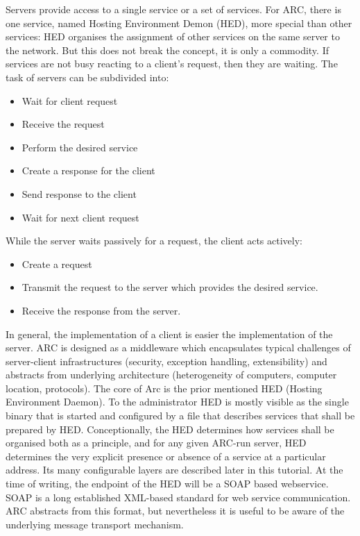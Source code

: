 Servers provide access to a single service or a set of services. For ARC, there is one service, named Hosting Environment Demon (HED), more special than other services: HED organises the assignment of other services on the same server to the network. But this does not break the concept, it is only a commodity. If services are not busy reacting to a client's request, then they are waiting. The task of servers can be subdivided into:
\begin{itemize}
 \item Wait for client request
 \item Receive the request
 \item Perform the desired service
 \item Create a response for the client
 \item Send response to the client
 \item Wait for next client request
\end{itemize}
While the server waits passively for a request, the client acts actively:
\begin{itemize}
 \item Create a request
 \item Transmit the request to the server which provides the desired service.
 \item Receive the response from the server.
 \end{itemize}
\forcelinebreak

In general, the implementation of a client is easier  the implementation of the server. 
ARC is designed as a middleware which encapsulates typical challenges of server-client infrastructures (security, exception handling, extensibility) and abstracts from underlying architecture (heterogeneity of computers, computer location, protocols).
The core of Arc is the prior mentioned HED (Hosting Environment Daemon). To the administrator HED is mostly visible as the single binary that is started and configured by a file that describes services that shall be prepared by HED. Conceptionally, the HED determines how services shall be organised both as a principle, and for any given ARC-run server, HED determines the very explicit presence or absence of a service at a particular address. Its many configurable layers are described later in this tutorial. 
%
At the time of writing, the endpoint of the HED will be a SOAP based webservice.
SOAP is a long established XML-based standard for web service communication.
ARC abstracts from this format, but nevertheless it is useful to be aware of
the underlying message transport mechanism.

